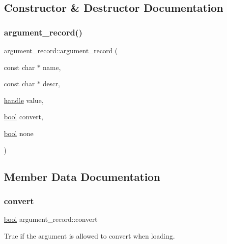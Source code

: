 \subsection{Constructor \& Destructor Documentation}
\mbox{\label{structargument__record_a3bb6ccaa62ea9acee95695698f949f97}} 
\subsubsection{\texorpdfstring{argument\_record()}{argument\_record()}}
{\footnotesize\ttfamily argument\+\_\+record\+::argument\+\_\+record (\begin{DoxyParamCaption}\item[{const char $\ast$}]{name,  }\item[{const char $\ast$}]{descr,  }\item[{\mbox{\hyperlink{classhandle}{handle}}}]{value,  }\item[{\mbox{\hyperlink{asdl_8h_af6a258d8f3ee5206d682d799316314b1}{bool}}}]{convert,  }\item[{\mbox{\hyperlink{asdl_8h_af6a258d8f3ee5206d682d799316314b1}{bool}}}]{none }\end{DoxyParamCaption})\hspace{0.3cm}{\ttfamily [inline]}}



\subsection{Member Data Documentation}
\mbox{\label{structargument__record_ab885e9c26fb95309b6f3f03410f36d30}} 
\subsubsection{\texorpdfstring{convert}{convert}}
{\footnotesize\ttfamily \mbox{\hyperlink{asdl_8h_af6a258d8f3ee5206d682d799316314b1}{bool}} argument\+\_\+record\+::convert}



True if the argument is allowed to convert when loading. 

\mbox{\label{structargument__record_a5bee7fa9c31dc8e5e1b9406cb483e610}} 
